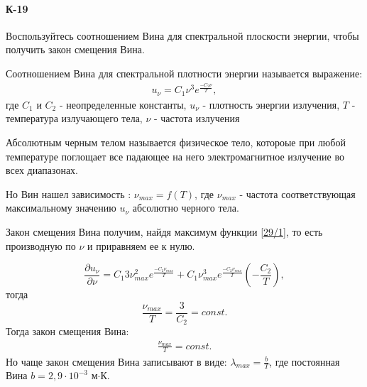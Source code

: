\documentclass[__main__.tex]{subfiles}
\begin{document}
\paragraph{К-19}
Воспользуйтесь соотношением Вина для спектральной плоскости энергии, чтобы получить закон смещения Вина.
\begin{definition}
	Соотношением Вина для спектральной плотности энергии называется выражение: 
	\begin{gather}
	\label{29/1}
          u_{\nu}=C_{1}\nu^{3}e^{\frac{-C_{2}\nu}{T}},
	\end{gather}
где $C_{1}$ и $C_{2}$ - неопределенные константы, $u_{\nu}$ - плотность энергии излучения, $T$ - температура излучающего тела, $\nu$ - частота излучения
\end{definition}

\begin{definition}
	Абсолютным черным телом называется физическое тело, котороые при любой температуре поглощает все падающее на него электромагнитное излучение во всех диапазонах.
\end{definition}
Но Вин нашел зависимость : $\nu_{max} = f(T)$, где $\nu_{max}$ - частота соответствующая максимальному значению $u_{\nu}$ абсолютно черного тела.

Закон смещения Вина получим, найдя максимум функции \ref{29/1}, то есть производную по $\nu$ и приравняем ее к нулю.

$$
   \frac {\partial u_{\nu}}{\partial \nu}= C_{1}3\nu_{max}^{2}e^{\frac{-C_{2}\nu_{max}}{T}}+
   C_{1}\nu_{max}^{3}e^{\frac{-C_{2}\nu_{max}}{T}}(-\frac{C_{2}}{T}),
$$
тогда
$$
    \frac{\nu_{max}}{T}=\frac{3}{C_{2}}=const.
$$
Тогда закон смещения Вина:
\begin{gather}
\label{goof}
            \frac{\nu_{max}}{T}=const.
\end{gather}
Но чаще закон смещения Вина записывают в виде: $\lambda_{max}=\frac{b}{T}$, где постоянная Вина $b=2,9\cdot10^{-3}$ м$\cdot$К. 
\end{document}
